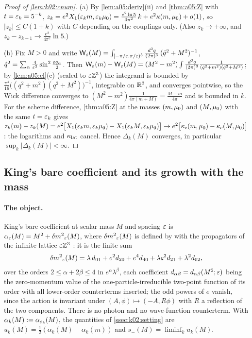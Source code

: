 \begin{proof}[Proof of \cref{lem:k02:cnum}]
(a) By \cref{lem:a05:deriv}(ii) and \cref{thm:a05:Z} with $t=\varepsilon_k=5^{-k}$, $z_k=e^2X_1(\varepsilon_km,\varepsilon_k\mu_0)=\frac{e^2\ln5}{4\pi^2}\,k+e^2\kappa(m,\mu_0)+o(1)$, so $|z_k|\le C(1+k)$ with $C$ depending on the couplings only. (Also $z_k\to+\infty$, and $z_k-z_{k-1}\to\frac{e^2}{4\pi^2}\ln5$.)

(b) Fix $M>0$ and write $\mathsf W_{\varepsilon}(M)=\int_{[-\pi/\varepsilon,\pi/\varepsilon)^3}\frac{d^3q}{(2\pi)^3}\,(\hat q^2+M^2)^{-1}$, $\hat q^2=\sum_\alpha\frac4{\varepsilon^2}\sin^2\frac{\varepsilon q_\alpha}2$. Then $\mathsf W_{\varepsilon}(m)-\mathsf W_{\varepsilon}(M)=(M^2-m^2)\int\frac{d^3q}{(2\pi)^3}\frac1{(\hat q^2+m^2)(\hat q^2+M^2)}$; by \cref{lem:a05:el}(c) (scaled to $\varepsilon\mathbb Z^3$) the integrand is bounded by $\frac{\pi^4}{16}\big((q^2+m^2)(q^2+M^2)\big)^{-1}$, integrable on $\mathbb R^3$, and converges pointwise, so the Wick difference converges to $(M^2-m^2)\frac1{4\pi(m+M)}=\frac{M-m}{4\pi}$ and is bounded in $k$. For the scheme difference, \cref{thm:a05:Z} at the masses $(m,\mu_0)$ and $(M,\mu_0)$ with the same $t=\varepsilon_k$ gives $z_k(m)-z_k(M)=e^2\big[X_1(\varepsilon_km,\varepsilon_k\mu_0)-X_1(\varepsilon_kM,\varepsilon_k\mu_0)\big]\to e^2\big[\kappa_{\rm c}(m,\mu_0)-\kappa_{\rm c}(M,\mu_0)\big]$: the logarithms and $\kappa_{\rm lat}$ cancel. Hence $\Delta_k(M)$ converges, in particular $\sup_k|\Delta_k(M)|<\infty$.
\end{proof}

\subsection{King's bare coefficient and its growth with the mass}\label{app:a05:B}

\paragraph{The object.} King's bare coefficient at scalar mass $M$ and spacing $\varepsilon$ is $\alpha_{\varepsilon}(M)=M^2+{\delta m^2}_{\varepsilon}(M)$, where ${\delta m^2}_{\varepsilon}(M)$ is defined by \cite[(3.32)--(3.33)]{K1} with the propagators of the infinite lattice $\varepsilon\mathbb Z^3$ \cite[p.~330]{K2}: it is the finite sum
\[
{\delta m^2}_{\varepsilon}(M)=\lambda\,d_{01}+e^2d_{20}+e^4d_{40}+\lambda e^2d_{21}+\lambda^2d_{02},
\]
over the orders $2\le\alpha+2\beta\le4$ in $e^\alpha\lambda^\beta$, each coefficient $d_{\alpha\beta}=d_{\alpha\beta}(M^2;\varepsilon)$ being the zero-momentum value of the one-particle-irreducible two-point function of its order with all lower-order counterterms inserted; the odd powers of $e$ vanish, since the action is invariant under $(A,\phi)\mapsto(-A,R\phi)$ with $R$ a reflection of the two components. There is no photon and no wave-function counterterm. With $\alpha_k(M):=\alpha_{\varepsilon_k}(M)$, the quantities of \cref{ssec:k02:setting} are $u_k(M)=\frac12(\alpha_k(M)-\alpha_k(m))$ and $s_-(M)=\liminf_ku_k(M)$.

